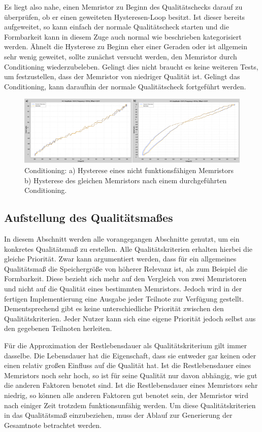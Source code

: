   Es liegt also nahe, einen Memristor zu Beginn des Qualitätschecks darauf zu überprüfen, ob er einen geweiteten Hysteresen-Loop besitzt. Ist dieser bereits aufgeweitet, so kann einfach der normale Qualitätscheck starten und die Formbarkeit kann in diesem Zuge auch normal wie beschrieben kategorisiert werden. Ähnelt die Hysterese zu Beginn eher einer Geraden oder ist allgemein sehr wenig geweitet, sollte zunächst versucht werden, den Memristor durch Conditioning \glqq wiederzubeleben\grqq. Gelingt dies nicht braucht es keine weiteren Tests, um festzustellen, dass der Memristor von niedriger Qualität ist. Gelingt das Conditioning, kann daraufhin der normale Qualitätscheck fortgeführt werden.

  \begin{figure}
    \centering
    \includegraphics[width=\textwidth]{images/Conditioning.png}
    \caption{Conditioning: a) Hysterese eines nicht funktionsfähigen Memristors b) Hysterese des gleichen Memristors nach einem durchgeführten Conditioning.}
    \label{fig:Hysteresen}
  \end{figure}

\subsection{Aufstellung des Qualitätsmaßes}
In diesem Abschnitt werden alle vorangegangen Abschnitte genutzt, um ein konkretes Qualitätsmaß zu erstellen. Alle Qualitätskriterien erhalten hierbei die gleiche Priorität. Zwar kann argumentiert werden, dass für ein allgemeines Qualitätsmaß die Speichergröße von höherer Relevanz ist, als zum Beispiel die Formbarkeit. Diese bezieht sich mehr auf den Vergleich von zwei Memristoren und nicht auf die Qualität eines bestimmten Memristors. Jedoch wird in der fertigen Implementierung eine Ausgabe jeder Teilnote zur Verfügung gestellt. Dementsprechend gibt es keine unterschiedliche Priorität zwischen den Qualitätskriterien. Jeder Nutzer kann sich eine eigene Priorität jedoch selbst aus den gegebenen Teilnoten herleiten.

Für die Approximation der Restlebensdauer als Qualitätskriterium gilt immer dasselbe. Die Lebensdauer hat die Eigenschaft, dass sie entweder gar keinen oder einen relativ großen Einfluss auf die Qualität hat. Ist die Restlebensdauer eines Memristors noch sehr hoch, so ist für seine Qualität nur davon abhängig, wie gut die anderen Faktoren benotet sind. Ist die Restlebensdauer eines Memristors sehr niedrig, so können alle anderen Faktoren gut benotet sein, der Memristor wird nach einiger Zeit trotzdem funktionsunfähig werden. Um diese Qualitätskriterien in das Qualitätsmaß einzubeziehen, muss der Ablauf zur Generierung der Gesamtnote betrachtet werden.

